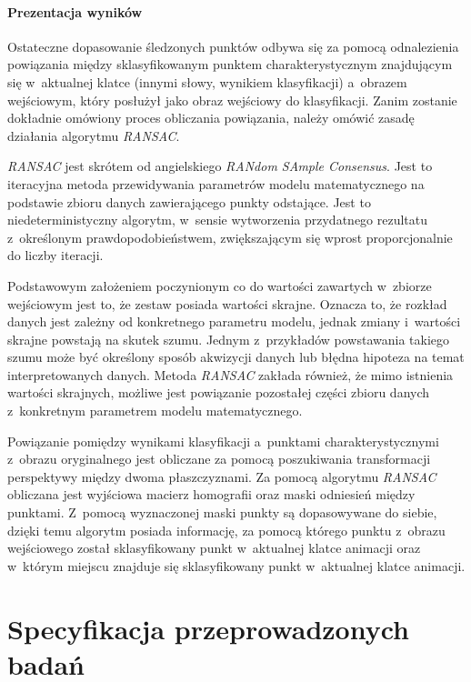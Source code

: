     \subsubsection{Prezentacja wyników}
    Ostateczne dopasowanie śledzonych punktów odbywa się za pomocą odnalezienia powiązania między sklasyfikowanym punktem charakterystycznym znajdującym się w~aktualnej klatce (innymi słowy, wynikiem klasyfikacji) a~obrazem wejściowym, który posłużył jako obraz wejściowy do klasyfikacji. Zanim zostanie dokładnie omówiony proces obliczania powiązania, należy omówić zasadę działania algorytmu \textit{RANSAC}.

    \textit{RANSAC} jest skrótem od angielskiego \textit{RANdom SAmple Consensus}. Jest to iteracyjna metoda przewidywania parametrów modelu matematycznego na podstawie zbioru danych zawierającego punkty odstające. Jest to niedeterministyczny algorytm, w~sensie wytworzenia przydatnego rezultatu z~określonym prawdopodobieństwem, zwiększającym się wprost proporcjonalnie do liczby iteracji.

    Podstawowym założeniem poczynionym co do wartości zawartych w~zbiorze wejściowym jest to, że zestaw posiada wartości skrajne. Oznacza to, że rozkład danych jest zależny od konkretnego parametru modelu, jednak zmiany i~wartości skrajne powstają na skutek szumu. Jednym z~przykładów powstawania takiego szumu może być określony sposób akwizycji danych lub błędna hipoteza na temat interpretowanych danych. Metoda \textit{RANSAC} zakłada również, że mimo istnienia wartości skrajnych, możliwe jest powiązanie pozostałej części zbioru danych z~konkretnym parametrem modelu matematycznego.

    Powiązanie pomiędzy wynikami klasyfikacji a~punktami charakterystycznymi z~obrazu oryginalnego jest obliczane za pomocą poszukiwania transformacji perspektywy między dwoma płaszczyznami. Za pomocą algorytmu \textit{RANSAC} obliczana jest wyjściowa macierz homografii oraz maski odniesień między punktami. Z~pomocą wyznaczonej maski punkty są dopasowywane do siebie, dzięki temu algorytm posiada informację, za pomocą którego punktu z~obrazu wejściowego został sklasyfikowany punkt w~aktualnej klatce animacji oraz w~którym miejscu znajduje się sklasyfikowany punkt w~aktualnej klatce animacji.

\chapter{Specyfikacja przeprowadzonych badań}\label{Chapter_SpecyfikacjaPrzeprowadzonychBadan}

